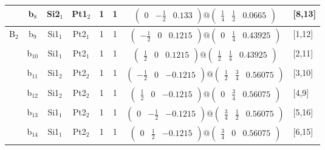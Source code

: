 \documentclass[fleqn,10pt,landscape]{article}
\begin{document}
\begin{itemize}
\begin{center}
\begin{longtable}{cc|cc|c|c|c|l}
& b$_{8}$ & Si2$_{1}$ & Pt1$_{2}$ & 1 & 1 & $\begin{pmatrix} 0 & - \frac{1}{2} & 0.133 \end{pmatrix}@\begin{pmatrix} \frac{1}{4} & \frac{1}{2} & 0.0665 \end{pmatrix}$ & [8,13] \\ \hline
B$_{2}$ & b$_{9}$ & Si1$_{1}$ & Pt2$_{1}$ & 1 & 1 & $\begin{pmatrix} - \frac{1}{2} & 0 & 0.1215 \end{pmatrix}@\begin{pmatrix} 0 & \frac{1}{4} & 0.43925 \end{pmatrix}$ & [1,12] \\
& b$_{10}$ & Si1$_{1}$ & Pt2$_{1}$ & 1 & 1 & $\begin{pmatrix} \frac{1}{2} & 0 & 0.1215 \end{pmatrix}@\begin{pmatrix} \frac{1}{2} & \frac{1}{4} & 0.43925 \end{pmatrix}$ & [2,11] \\
& b$_{11}$ & Si1$_{2}$ & Pt2$_{2}$ & 1 & 1 & $\begin{pmatrix} - \frac{1}{2} & 0 & -0.1215 \end{pmatrix}@\begin{pmatrix} \frac{1}{2} & \frac{3}{4} & 0.56075 \end{pmatrix}$ & [3,10] \\
& b$_{12}$ & Si1$_{2}$ & Pt2$_{2}$ & 1 & 1 & $\begin{pmatrix} \frac{1}{2} & 0 & -0.1215 \end{pmatrix}@\begin{pmatrix} 0 & \frac{3}{4} & 0.56075 \end{pmatrix}$ & [4,9] \\
& b$_{13}$ & Si1$_{1}$ & Pt2$_{2}$ & 1 & 1 & $\begin{pmatrix} 0 & - \frac{1}{2} & -0.1215 \end{pmatrix}@\begin{pmatrix} \frac{3}{4} & \frac{1}{2} & 0.56075 \end{pmatrix}$ & [5,16] \\
& b$_{14}$ & Si1$_{1}$ & Pt2$_{2}$ & 1 & 1 & $\begin{pmatrix} 0 & \frac{1}{2} & -0.1215 \end{pmatrix}@\begin{pmatrix} \frac{3}{4} & 0 & 0.56075 \end{pmatrix}$ & [6,15] \\

\end{longtable}
\end{center}
\end{itemize}
\end{document}
